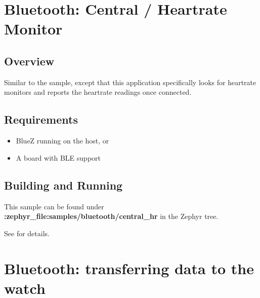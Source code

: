 \documentclass[letterpaper,10pt,english]{sphinxmanual}
\begin{document}
\section{Bluetooth: Central / Heart\sphinxhyphen{}rate Monitor}
\label{\detokenize{samples/samplesbluetoothcentral_hrREADME:bluetooth-central-heart-rate-monitor}}\label{\detokenize{samples/samplesbluetoothcentral_hrREADME:bluetooth-central-hr}}\label{\detokenize{samples/samplesbluetoothcentral_hrREADME::doc}}

\subsection{Overview}
\label{\detokenize{samples/samplesbluetoothcentral_hrREADME:overview}}
Similar to the  sample, except that this
application specifically looks for heart\sphinxhyphen{}rate monitors and reports the
heart\sphinxhyphen{}rate readings once connected.


\subsection{Requirements}
\label{\detokenize{samples/samplesbluetoothcentral_hrREADME:requirements}}\begin{itemize}
\item {} 
BlueZ running on the host, or

\item {} 
A board with BLE support

\end{itemize}


\subsection{Building and Running}
\label{\detokenize{samples/samplesbluetoothcentral_hrREADME:building-and-running}}
This sample can be found under {\color{red}\bfseries{}:zephyr\_file:\textasciigrave{}samples/bluetooth/central\_hr\textasciigrave{}} in the
Zephyr tree.

See  for details.


\section{Bluetooth: transferring data to the watch}
\label{\detokenize{samples/samplesbluetoothperipheral-getparamREADME:bluetooth-transferring-data-to-the-watch}}\label{\detokenize{samples/samplesbluetoothperipheral-getparamREADME:ble-peripheral}}\label{\detokenize{samples/samplesbluetoothperipheral-getparamREADME::doc}}
\end{document}
